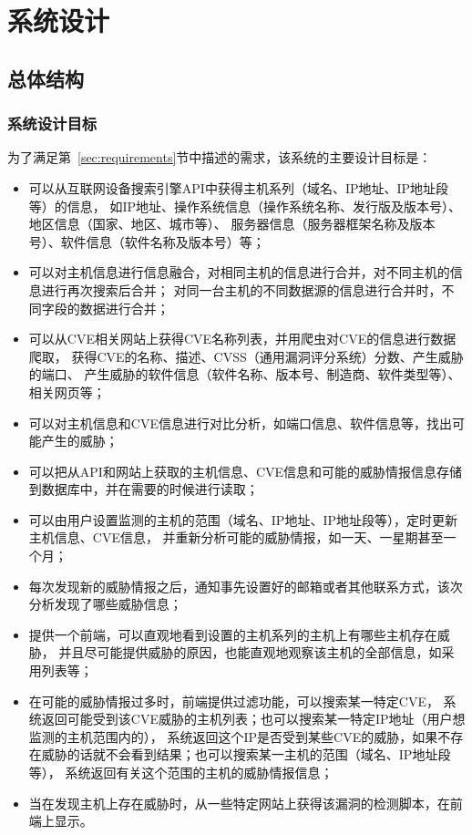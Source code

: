 \chapter{系统设计}
\label{cha:design}

\section{总体结构}
\label{chap3:structure}

\subsection{系统设计目标}
\label{sec:goal}

为了满足第~\ref{sec:requirements}节中描述的需求，该系统的主要设计目标是：

\begin{itemize}
    \item 可以从互联网设备搜索引擎API中获得主机系列（域名、IP地址、IP地址段等）的信息，
    如IP地址、操作系统信息（操作系统名称、发行版及版本号）、地区信息（国家、地区、城市等）、
    服务器信息（服务器框架名称及版本号）、软件信息（软件名称及版本号）等；
    \item 可以对主机信息进行信息融合，对相同主机的信息进行合并，对不同主机的信息进行再次搜索后合并；
    对同一台主机的不同数据源的信息进行合并时，不同字段的数据进行合并；
    \item 可以从CVE相关网站上获得CVE名称列表，并用爬虫对CVE的信息进行数据爬取，
    获得CVE的名称、描述、CVSS\cite{mell2007complete}（通用漏洞评分系统）分数、产生威胁的端口、
    产生威胁的软件信息（软件名称、版本号、制造商、软件类型等）、相关网页等；
    \item 可以对主机信息和CVE信息进行对比分析，如端口信息、软件信息等，找出可能产生的威胁；
    \item 可以把从API和网站上获取的主机信息、CVE信息和可能的威胁情报信息存储到数据库中，并在需要的时候进行读取；
    \item 可以由用户设置监测的主机的范围（域名、IP地址、IP地址段等），定时更新主机信息、CVE信息，
    并重新分析可能的威胁情报，如一天、一星期甚至一个月；
    \item 每次发现新的威胁情报之后，通知事先设置好的邮箱或者其他联系方式，该次分析发现了哪些威胁信息；
    \item 提供一个前端，可以直观地看到设置的主机系列的主机上有哪些主机存在威胁，
    并且尽可能提供威胁的原因，也能直观地观察该主机的全部信息，如采用列表等；
    \item 在可能的威胁情报过多时，前端提供过滤功能，可以搜索某一特定CVE，
    系统返回可能受到该CVE威胁的主机列表；也可以搜索某一特定IP地址（用户想监测的主机范围内的），
    系统返回这个IP是否受到某些CVE的威胁，如果不存在威胁的话就不会看到结果；也可以搜索某一主机的范围（域名、IP地址段等），
    系统返回有关这个范围的主机的威胁情报信息；
    \item 当在发现主机上存在威胁时，从一些特定网站上获得该漏洞的检测脚本，在前端上显示。
\end{itemize}

